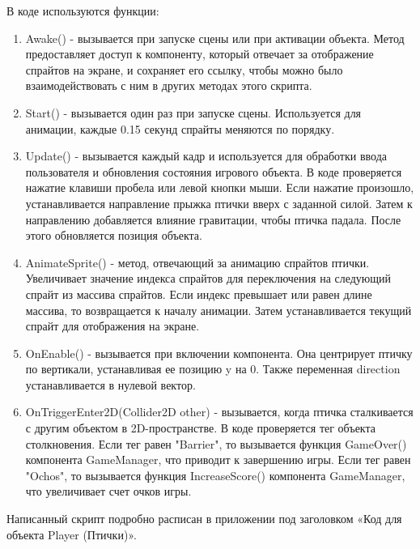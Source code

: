 \documentclass[14pt, oneside]{altsu-report}
\begin{document}
В коде используются функции:

\begin{enumerate}
\item Awake() - вызывается при запуске сцены или при активации объекта. Метод предоставляет доступ к компоненту, который отвечает за отображение спрайтов на экране, и сохраняет его ссылку, чтобы можно было взаимодействовать с ним в других методах этого скрипта.
\item Start() - вызывается один раз при запуске сцены. Используется для анимации, каждые 0.15 секунд спрайты меняются по порядку.
\item Update() - вызывается каждый кадр и используется для обработки ввода пользователя и обновления состояния игрового объекта. В коде проверяется нажатие клавиши пробела или левой кнопки мыши. Если нажатие произошло, устанавливается направление прыжка птички вверх с заданной силой. Затем к направлению добавляется влияние гравитации, чтобы птичка падала. После этого обновляется позиция объекта.
\item AnimateSprite() - метод, отвечающий за анимацию спрайтов птички. Увеличивает значение индекса спрайтов для переключения на следующий спрайт из массива спрайтов. Если индекс превышает или равен длине массива, то возвращается к началу анимации. Затем устанавливается текущий спрайт для отображения на экране.
\item OnEnable() - вызывается при включении компонента. Она центрирует птичку по вертикали, устанавливая ее позицию y на 0. Также переменная direction устанавливается в нулевой вектор.
\item OnTriggerEnter2D(Collider2D other) - вызывается, когда птичка сталкивается с другим объектом в 2D-пространстве. В коде проверяется тег объекта столкновения. Если тег равен "Barrier", то вызывается функция GameOver() компонента GameManager, что приводит к завершению игры. Если тег равен "Ochos", то вызывается функция IncreaseScore() компонента GameManager, что увеличивает счет очков игры.
\end{enumerate} 

Написанный скрипт подробно расписан в приложении под заголовком «Код для объекта Player (Птички)».
\end{document}
